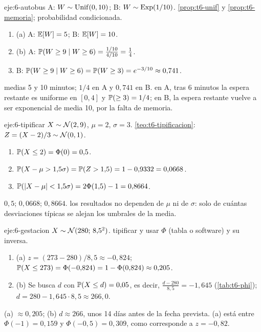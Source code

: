 \begin{solucion}{eje:6-autobus}
\datos A: $W\sim\operatorname{Unif}(0,10)$; B: $W\sim\operatorname{Exp}(1/10)$.
\planteamiento \cref{prop:t6-unif} y \cref{prop:t6-memoria}; probabilidad condicionada.
\pasos
\begin{enumerate}[label=\arabic*.]
  \item (a) A: $\mathbb{E}[W]=5$; B: $\mathbb{E}[W]=10$.
  \item (b) A: $\mathbb{P}(W\ge9\mid W\ge6)=\frac{1/10}{4/10}=\frac14$.
  \item B: $\mathbb{P}(W\ge9\mid W\ge6)=\mathbb{P}(W\ge3)=e^{-3/10}\approx0{,}741$.
\end{enumerate}
\resultado medias 5 y 10 minutos; $1/4$ en A y $0{,}741$ en B.
\comprobacion en A, tras 6 minutos la espera restante es uniforme en $[0,4]$ y $\mathbb{P}(\ge3)=1/4$; en B, la espera restante vuelve a ser exponencial de media 10, por la falta de memoria.
\end{solucion}

\begin{solucion}{eje:6-tipificar}
\datos $X\sim\mathcal{N}(2,9)$, $\mu=2$, $\sigma=3$.
\planteamiento \cref{teo:t6-tipificacion}: $Z=(X-2)/3\sim\mathcal{N}(0,1)$.
\pasos
\begin{enumerate}[label=\arabic*.]
  \item $\mathbb{P}(X\le2)=\Phi(0)=0{,}5$.
  \item $\mathbb{P}(X-\mu>1{,}5\sigma)=\mathbb{P}(Z>1{,}5)=1-0{,}9332=0{,}0668$.
  \item $\mathbb{P}(\lvert X-\mu\rvert<1{,}5\sigma)=2\Phi(1{,}5)-1=0{,}8664$.
\end{enumerate}
\resultado $0{,}5$; $0{,}0668$; $0{,}8664$.
\comprobacion los resultados no dependen de $\mu$ ni de $\sigma$: solo de cuántas desviaciones típicas se alejan los umbrales de la media.
\end{solucion}

\begin{solucion}{eje:6-gestacion}
\datos $X\sim\mathcal{N}(280;\,8{,}5^{2})$.
\planteamiento tipificar y usar $\Phi$ (tabla o software) y su inversa.
\pasos
\begin{enumerate}[label=\arabic*.]
  \item (a) $z=(273-280)/8{,}5\approx-0{,}824$; $\mathbb{P}(X\le273)=\Phi(-0{,}824)=1-\Phi(0{,}824)\approx0{,}205$.
  \item (b) Se busca $d$ con $\mathbb{P}(X\le d)=0{,}05$, es decir, $\frac{d-280}{8{,}5}=-1{,}645$ (\cref{tab:t6-phi}); $d=280-1{,}645\cdot8{,}5\approx266{,}0$.
\end{enumerate}
\resultado (a) $\approx0{,}205$; (b) $d\approx266$, unos 14 días antes de la fecha prevista.
\comprobacion (a) está entre $\Phi(-1)=0{,}159$ y $\Phi(-0{,}5)=0{,}309$, como corresponde a $z=-0{,}82$.
\end{solucion}

